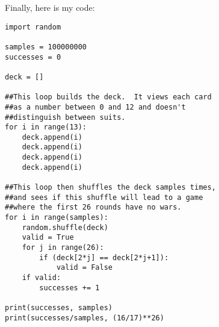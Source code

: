 \documentclass[11pt]{article}
\theoremstyle{definition}
\begin{document}
Finally, here is my code:
\begin{verbatim}
import random

samples = 100000000
successes = 0

deck = []

##This loop builds the deck.  It views each card
##as a number between 0 and 12 and doesn't
##distinguish between suits.
for i in range(13):
    deck.append(i)
    deck.append(i)
    deck.append(i)
    deck.append(i)

##This loop then shuffles the deck samples times,
##and sees if this shuffle will lead to a game
##where the first 26 rounds have no wars.
for i in range(samples):
    random.shuffle(deck)
    valid = True
    for j in range(26):
        if (deck[2*j] == deck[2*j+1]):
            valid = False
    if valid:
        successes += 1

print(successes, samples)
print(successes/samples, (16/17)**26)
\end{verbatim}
\end{document}
